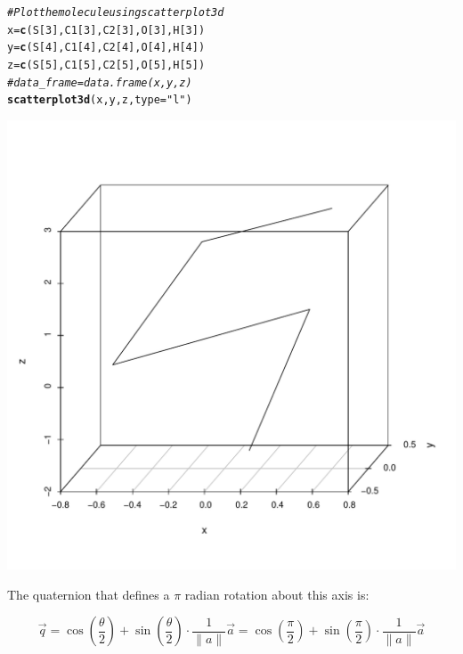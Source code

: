 \documentclass{article}\usepackage[]{graphicx}\usepackage[]{color}
\makeatletter
\def\maxwidth{ %
  \ifdim\Gin@nat@width>\linewidth
    \linewidth
  \else
    \Gin@nat@width
  \fi
}
\newcommand{\hlnum}[1]{\textcolor[rgb]{0.686,0.059,0.569}{#1}}%
\newcommand{\hlstr}[1]{\textcolor[rgb]{0.192,0.494,0.8}{#1}}%
\newcommand{\hlcom}[1]{\textcolor[rgb]{0.678,0.584,0.686}{\textit{#1}}}%
\newcommand{\hlstd}[1]{\textcolor[rgb]{0.345,0.345,0.345}{#1}}%
\newcommand{\hlkwb}[1]{\textcolor[rgb]{0.69,0.353,0.396}{#1}}%
\newcommand{\hlkwc}[1]{\textcolor[rgb]{0.333,0.667,0.333}{#1}}%
\newcommand{\hlkwd}[1]{\textcolor[rgb]{0.737,0.353,0.396}{\textbf{#1}}}%
\newenvironment{kframe}{%
 \def\at@end@of@kframe{}%
 \ifinner\ifhmode%
  \def\at@end@of@kframe{\end{minipage}}%
  \begin{minipage}{\columnwidth}%
 \fi\fi%
 \def\FrameCommand##1{\hskip\@totalleftmargin \hskip-\fboxsep
 \colorbox{shadecolor}{##1}\hskip-\fboxsep
     \hskip-\linewidth \hskip-\@totalleftmargin \hskip\columnwidth}%
 \MakeFramed {\advance\hsize-\width
   \@totalleftmargin\z@ \linewidth\hsize
   \@setminipage}}%
 {\par\unskip\endMakeFramed%
 \at@end@of@kframe}
\newenvironment{knitrout}{}{} %
\makeatother
\begin{document}
\begin{knitrout}
\begin{kframe}
{\ttfamily\noindent\itshape\color{messagecolor}{\#\# The normed axis of rotation is: 0.205342766021818, 0, 0.978690118700761}}\begin{alltt}
  \hlcom{#Plot the molecule using scatterplot3d}
  \hlstd{x} \hlkwb{=} \hlkwd{c}\hlstd{(S[}\hlnum{3}\hlstd{],C1[}\hlnum{3}\hlstd{],C2[}\hlnum{3}\hlstd{],O[}\hlnum{3}\hlstd{],H[}\hlnum{3}\hlstd{])}
  \hlstd{y} \hlkwb{=} \hlkwd{c}\hlstd{(S[}\hlnum{4}\hlstd{],C1[}\hlnum{4}\hlstd{],C2[}\hlnum{4}\hlstd{],O[}\hlnum{4}\hlstd{],H[}\hlnum{4}\hlstd{])}
  \hlstd{z} \hlkwb{=} \hlkwd{c}\hlstd{(S[}\hlnum{5}\hlstd{],C1[}\hlnum{5}\hlstd{],C2[}\hlnum{5}\hlstd{],O[}\hlnum{5}\hlstd{],H[}\hlnum{5}\hlstd{])}
  \hlcom{#data_frame = data.frame(x,y,z)}
  \hlkwd{scatterplot3d}\hlstd{(x,y,z,}\hlkwc{type} \hlstd{=} \hlstr{"l"}\hlstd{)}
\end{alltt}
\end{kframe}
\includegraphics[width=\maxwidth]{figure/define-axis-1} 

\end{knitrout}

The quaternion that defines a $\pi$ radian rotation about this axis is:

$$\vec{q}=\cos(\frac{\theta}{2})+\sin(\frac{\theta}{2})\cdot\frac{1}{\| a \|}\vec{a}=\cos(\frac{\pi}{2})+\sin(\frac{\pi}{2})\cdot\frac{1}{\| a \|}\vec{a}$$
\end{document}
